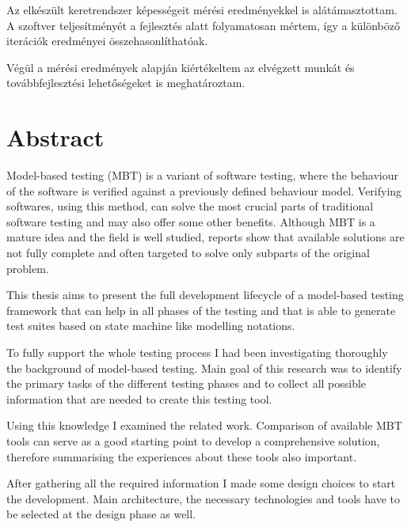 Az elkészült keretrendszer képességeit mérési eredményekkel is alátámasztottam. A szoftver teljesítményét a fejlesztés alatt folyamatosan mértem, így a különböző iterációk eredményei összehasonlíthatóak.

Végül a mérési eredmények alapján kiértékeltem az elvégzett munkát és továbbfejlesztési lehetőségeket is meghatároztam.

\vfill
{}
\englishParagraph


\chapter*{Abstract}
\label{cha:abstract}

Model-based testing (MBT) is a variant of software testing, where the behaviour of the software is verified against a previously defined behaviour model. Verifying softwares, using this method, can solve the most crucial parts of traditional software testing and may also offer some other benefits. Although MBT is a mature idea and the field is well studied, reports show that available solutions are not fully complete and often targeted to solve only subparts of the original problem.

This thesis aims to present the full development lifecycle of a model-based testing framework that can help in all phases of the testing and that is able to generate test suites based on state machine like modelling notations.

To fully support the whole testing process I had been investigating thoroughly the background of model-based testing. Main goal of this research was to identify the primary tasks of the different testing phases and to collect all possible information that are needed to create this testing tool.

Using this knowledge I examined the related work. Comparison of available MBT tools can serve as a good starting point to develop a comprehensive solution, therefore summarising the experiences about these tools also important.

After gathering all the required information I made some design choices to start the development. Main architecture, the necessary technologies and tools have to be selected at the design phase as well.

